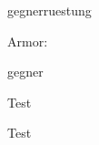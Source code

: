 \documentclass[12pt]{pnpprep}
\begin{document}
%
%
%


\begin{blueprint}{gegnerruestung}


    \begin{render}
        Armor: \namevalue
    \end{render}

\end{blueprint}


\begin{blueprint}{gegner}



    \begin{render}
        Test
    \end{render}

\end{blueprint}


\begin{gegner}

    Test

    \begin{ruestung}
    \end{ruestung}

\end{gegner}
\end{document}
